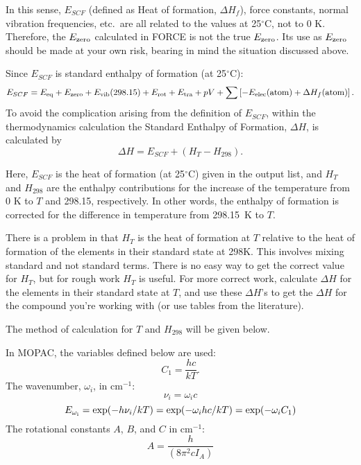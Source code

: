 In  this  sense, $E_{SCF}$  (defined  as  Heat  of  formation, $\Delta H_f$),
force constants,  normal  vibration  frequencies, etc.\  are  all related to
the values at 25$^\circ$C, not to 0 K.  Therefore, the $E_{\rm zero}$
calculated in FORCE is not the true $E_{\rm zero}$. Its use as $E_{\rm zero}$
should be made at your own risk, bearing in mind the situation discussed above.

Since $E_{SCF}$ is standard enthalpy of formation (at 25$^\circ$C):
\begin{equation}
E_{SCF} = E_{\rm eq} + E_{\rm zero} +
E_{\rm vib}(298.15) + E_{\rm rot} + E_{\rm tra} + pV
 + \sum\left[ - E_{\rm elec}({\rm atom}) + \Delta H_f({\rm atom})\right].
\label{eq29}
\end{equation}
To avoid the complication arising from the definition of $E_{SCF}$, within
the  thermodynamics  calculation  the  Standard  Enthalpy  of Formation,
$\Delta H$, is calculated by
\begin{equation}
\Delta H = E_{SCF} + (H_T - H_{298}). \label{eq30}
\end{equation}

Here, $E_{SCF}$ is the heat of formation (at 25$^\circ$C)  given in the output
list, and $H_T$ and $H_{298}$ are the enthalpy contributions for the increase
of the temperature from 0 K to $T$ and 298.15, respectively.  In other words,
the enthalpy of formation is corrected for the difference in temperature from
298.15~K to $T$.

There is a problem in that $H_T$ is the heat of formation at $T$ relative to
the heat of formation of the elements in their standard state at 298K. This
involves mixing standard and not standard terms. There is no easy way to get
 the correct value for $H_T$, but for rough work $H_T$ is useful. For more correct
 work, calculate $\Delta H$ for the elements in their standard state at $T$, and use
 these $\Delta H$'s to get the $\Delta H$ for the compound you're working with (or use
 tables from the literature).

 The method of calculation for $T$ and $H_{298}$ will  be
given below.

In MOPAC, the variables defined below are used:
\begin{equation}
C_1 = \frac{hc}{kT}.   \nonumber\label{eq31}
\end{equation}
The wavenumber, $\omega_i$, in cm$^{-1}$:
\begin{equation}
\nu_i = \omega_i c    \nonumber\label{eq32}
\end{equation}
\begin{equation}
E_{\rm \omega_i} = \exp( -h\nu_i/kT) = \exp(-\omega_i hc/kT) = \exp(-\omega_i C_1) \nonumber\label{eq33}
\end{equation}
The rotational constants $A$, $B$, and $C$ in cm$^{-1}$:
\begin{equation}
A = \frac{h}{(8\pi^2 cI_A)}   \nonumber\label{eq34}
\end{equation}


